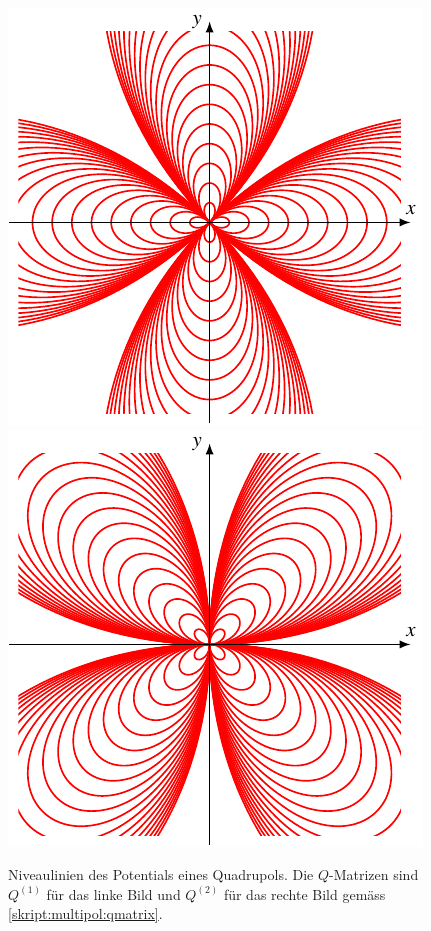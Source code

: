 \begin{figure}
\includegraphics{chapters/tikz/quadrupol.pdf}
\includegraphics{chapters/tikz/quadrupol1.pdf}
\caption{Niveaulinien des Potentials eines Quadrupols.
Die $Q$-Matrizen sind 
$Q^{(1)}$ für das linke Bild und $Q^{(2)}$
für das rechte Bild
gemäss \eqref{skript:multipol:qmatrix}.
\label{chapter:multipol:quadrupolniveaux}}
\end{figure}

